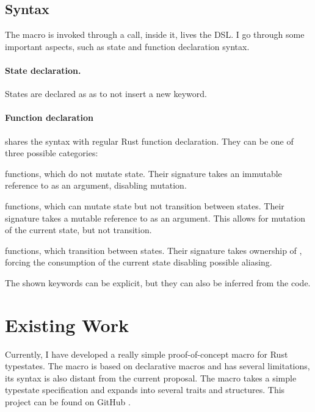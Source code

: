 
\subsection{Syntax}

The macro is invoked through a  call, inside it, lives the DSL.
I go through some important aspects, such as state and function declaration syntax.

\paragraph{State declaration.}
States are declared as  as to not insert a new  keyword.

\paragraph{Function declaration} shares the syntax with regular Rust function declaration.
They can be one of three possible categories:
\begin{compactitem}
    \item {} functions, which do not mutate state.
    Their signature takes an immutable reference to  as an argument,
    disabling mutation.
    \item {} functions, which can mutate state but not transition between states.
    Their signature takes a mutable reference to  as an argument.
    This allows for mutation of the current state, but not transition.
    \item {} functions, which transition between states.
    Their signature takes ownership of ,
    forcing the consumption of the current state disabling possible aliasing.
\end{compactitem}
The shown keywords can be explicit, but they can also be inferred from the code.

\section{Existing Work}

Currently, I have developed a really simple proof-of-concept macro for Rust typestates.
The macro is based on declarative macros and has several limitations,
its syntax is also distant from the current proposal.
The macro takes a simple typestate specification and expands into several traits and structures.
This project can be found on GitHub \autocite{Duarte2020a}.

